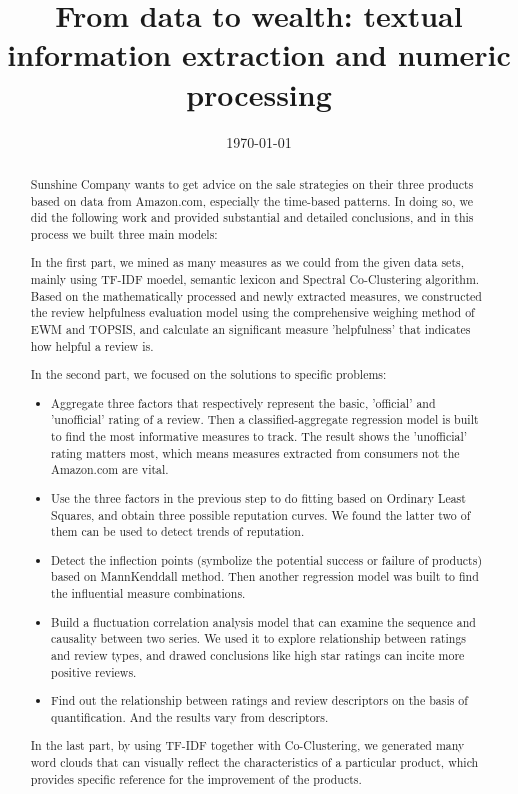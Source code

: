 \documentclass{mcmthesis}
\title{From data to wealth: textual information extraction and numeric processing}
\date{\today}
\begin{document}
\begin{abstract}


Sunshine Company wants to get advice on the sale strategies on their three products based on data from Amazon.com, especially the time-based patterns. In doing so, we did the following work and provided substantial and detailed conclusions, and in this process we built three main models: 

In the first part, we mined as many measures as we could from the given data sets, mainly using TF-IDF moedel, semantic lexicon and Spectral Co-Clustering algorithm. Based on the mathematically processed and newly extracted measures, we constructed the review helpfulness evaluation model using the comprehensive weighing method of EWM and TOPSIS, and calculate an significant measure 'helpfulness' that indicates how helpful a review is.

In the second part, we focused on the solutions to specific problems:
\begin{itemize}
\item  Aggregate three factors that respectively represent the basic, 'official' and 'unofficial' rating of a review. Then a classified-aggregate regression model is built to find the most informative measures to track. The result shows the 'unofficial' rating matters most, which means measures extracted from consumers not the Amazon.com are vital.

\item  Use the three factors in the previous step to do fitting based on Ordinary Least Squares, and obtain three possible reputation curves. We found the latter two of them can be used to detect trends of reputation.

\item  Detect the inflection points (symbolize the potential success or failure of products) based on MannKenddall method. Then another regression model was built to find the influential measure combinations.
\item  Build a fluctuation correlation analysis model that can examine the sequence and causality between two series. We used it to explore relationship between ratings and review types, and drawed conclusions like high star ratings can incite more positive reviews.
\item  Find out the relationship between ratings and review descriptors on the basis of quantification. And the results vary from descriptors.
\end{itemize}

In the last part, by using TF-IDF together with Co-Clustering, we generated many word clouds that can visually reflect the characteristics of a particular product, which provides specific reference for the improvement of the products.

\end{abstract}
\end{document}

